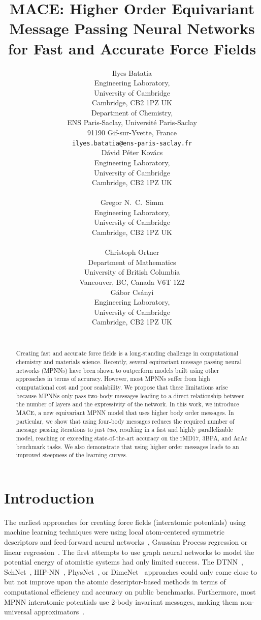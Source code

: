 \documentclass{article}
\title{MACE: Higher Order Equivariant Message Passing Neural Networks for Fast and Accurate Force Fields}
\author{%
  Ilyes Batatia \\
  Engineering Laboratory, \\
  University of Cambridge\\
  Cambridge, CB2 1PZ UK \\
  Department of Chemistry, \\
  ENS Paris-Saclay,
  Université Paris-Saclay \\
  91190 Gif-sur-Yvette, France \\
  \texttt{ilyes.batatia@ens-paris-saclay.fr} \\
  \And
  D\'{a}vid P\'{e}ter Kov\'{a}cs \\
  Engineering Laboratory, \\
  University of Cambridge\\
  Cambridge, CB2 1PZ UK \\
  \texttt{} \\
  \AND
  Gregor N.\ C.\ Simm \\
  Engineering Laboratory, \\
  University of Cambridge\\
  Cambridge, CB2 1PZ UK \\
  \texttt{} \\
  \And
  Christoph Ortner \\
  Department of Mathematics \\
  University of British Columbia \\
  Vancouver, BC, Canada V6T 1Z2 \\
  \AND
  G\'abor Cs\'anyi \\
  Engineering Laboratory, \\
  University of Cambridge\\
  Cambridge, CB2 1PZ UK \\
  \texttt{} \\
}
\begin{document}
\maketitle

\begin{abstract}
  Creating fast and accurate force fields is a long-standing challenge in computational chemistry and materials science.
  Recently, several equivariant message passing neural networks (MPNNs) have been shown to outperform models built using other approaches in terms of accuracy. However, most MPNNs suffer from high computational cost and poor scalability.
  We propose that these limitations arise because MPNNs only pass two-body messages leading to a direct relationship between the number of layers and the expressivity of the network.
  In this work, we introduce MACE, a new equivariant MPNN model that uses higher body order messages.
  In particular, we show that using four-body messages reduces the required number of message passing iterations to just \emph{two}, resulting in a fast and highly parallelizable model, reaching or exceeding state-of-the-art accuracy on the rMD17, 3BPA, and AcAc benchmark tasks.
  We also demonstrate that using higher order messages leads to an improved steepness of the learning curves.
\end{abstract}

\section{Introduction}
\label{sec:intro}
%
The earliest approaches for creating
force fields (interatomic potentials) using machine learning techniques were using local atom-centered symmetric descriptors and feed-forward neural networks~\cite{Behler2007}, Gaussian Process regression\cite{Bartok2010-uw} or linear regression~\cite{MTP, THOMPSON2015SNAP}.
The first attempts to use graph neural networks to model the potential energy of atomistic systems had only limited success.
The DTNN~\cite{schutt2017quantum}, SchNet~\cite{schnet}, HIP-NN~\cite{lubbers2018hierarchical}, PhysNet~\cite{unke2019physnet}, or DimeNet~\cite{Gasteiger2020Diment++, DimeNet} approaches could only come close to but not improve upon the atomic descriptor-based methods in terms of computational efficiency and accuracy on public benchmarks.
Furthermore, most MPNN interatomic potentials use 2-body invariant messages,
making them non-universal approximators~\cite{pozdnyakov2022incompleteness}.
\end{document}
